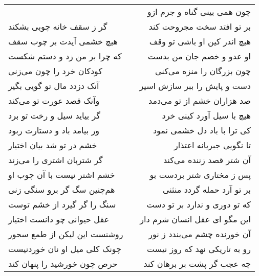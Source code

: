 \begin{center}
\begin{longtable}{l p{0.5cm} r}
&&
چون همی بینی گناه و جرم ازو
\\
گر ز سقف خانه چوبی بشکند
&&
بر تو افتد سخت مجروحت کند
\\
هیچ خشمی آیدت بر چوب سقف
&&
هیچ اندر کین او باشی تو وقف
\\
که چرا بر من زد و دستم شکست
&&
او عدو و خصم جان من بدست
\\
کودکان خرد را چون می‌زنی
&&
چون بزرگان را منزه می‌کنی
\\
آنک دزدد مال تو گویی بگیر
&&
دست و پایش را ببر سازش اسیر
\\
وآنک قصد عورت تو می‌کند
&&
صد هزاران خشم از تو می‌دمد
\\
گر بیاید سیل و رخت تو برد
&&
هیچ با سیل آورد کینی خرد
\\
ور بیامد باد و دستارت ربود
&&
کی ترا با باد دل خشمی نمود
\\
خشم در تو شد بیان اختیار
&&
تا نگویی جبریانه اعتذار
\\
گر شتربان اشتری را می‌زند
&&
آن شتر قصد زننده می‌کند
\\
خشم اشتر نیست با آن چوب او
&&
پس ز مختاری شتر بردست بو
\\
هم‌چنین سگ گر برو سنگی زنی
&&
بر تو آرد حمله گردد منثنی
\\
سنگ را گر گیرد از خشم توست
&&
که تو دوری و ندارد بر تو دست
\\
عقل حیوانی چو دانست اختیار
&&
این مگو ای عقل انسان شرم دار
\\
روشنست این لیکن از طمع سحور
&&
آن خورنده چشم می‌بندد ز نور
\\
چونک کلی میل او نان خوردنیست
&&
رو به تاریکی نهد که روز نیست
\\
حرص چون خورشید را پنهان کند
&&
چه عجب گر پشت بر برهان کند
\\
\end{longtable}
\end{center}

